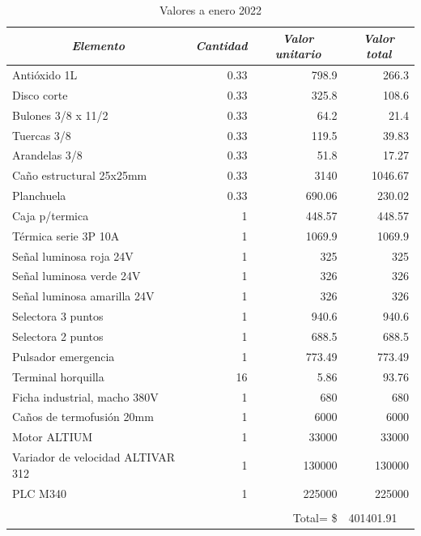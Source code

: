 \begin{table}[h!]
	\centering
	\caption{Valores a enero 2022}
	\label{tab:presu}
	\begin{tabular}{|l|r|r|r|}
		\hline
		\multicolumn{1}{|c|}{\textit{\textbf{Elemento}}} & \multicolumn{1}{c|}{\textit{\textbf{Cantidad}}} & \multicolumn{1}{c|}{\textit{\textbf{Valor unitario}}} & \multicolumn{1}{c|}{\textit{\textbf{Valor total}}} \\ \hline
		Antióxido 1L & 0.33 & 798.9 & 266.3 \\ \hline
		Disco corte & 0.33 & 325.8 & 108.6 \\ \hline
		Bulones 3/8 x 11/2 & 0.33 & 64.2 & 21.4 \\ \hline
		Tuercas 3/8 & 0.33 & 119.5 & 39.83 \\ \hline
		Arandelas 3/8 & 0.33 & 51.8 & 17.27 \\ \hline
		Caño estructural 25x25mm & 0.33 & 3140 & 1046.67 \\ \hline
		Planchuela & 0.33 & 690.06 & 230.02 \\ \hline
		Caja p/termica & 1 & 448.57 & 448.57 \\ \hline
		Térmica serie 3P 10A & 1 & 1069.9 & 1069.9 \\ \hline
		Señal luminosa roja 24V & 1 & 325 & 325 \\ \hline
		Señal luminosa verde 24V & 1 & 326 & 326 \\ \hline
		Señal luminosa amarilla 24V & 1 & 326 & 326 \\ \hline
		Selectora 3 puntos & 1 & 940.6 & 940.6 \\ \hline
		Selectora 2 puntos & 1 & 688.5 & 688.5 \\ \hline
		Pulsador emergencia & 1 & 773.49 & 773.49 \\ \hline
		Terminal horquilla & 16 & 5.86 & 93.76 \\ \hline
		Ficha industrial, macho 380V & 1 & 680 & 680 \\ \hline
		Caños de termofusión 20mm & 1 & 6000 & 6000 \\ \hline
		Motor ALTIUM & 1 & 33000 & 33000 \\ \hline
		Variador de velocidad ALTIVAR 312 & 1 & 130000 & 130000 \\ \hline
		PLC M340 & 1 & 225000 & 225000 \\ \hline
		& \multicolumn{1}{l|}{} &  & \multicolumn{1}{l|}{} \\ \hline
		& \multicolumn{1}{l|}{} & Total=    \$ & \multicolumn{1}{l|}{401401.91} \\ \hline
	\end{tabular}
\end{table}



\newpage